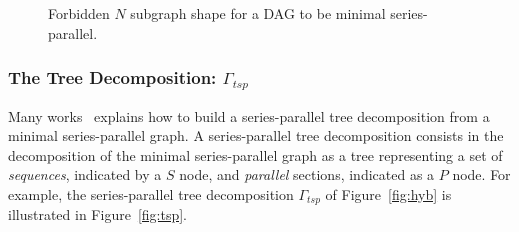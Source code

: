 \begin{figure}[h!]
\begin{center}
  \hspace{25pt}
  \caption{Forbidden $N$ subgraph shape for a DAG to be minimal series-parallel.}
  \label{fig:forbidden}
\end{center}
\end{figure}

\subsubsection*{The Tree Decomposition: $\Gamma_{tsp}$}
Many works~\cite{Valdes:1979:RSP:800135.804393,Schoenmakers95anew} explains how to build a series-parallel tree decomposition from a minimal series-parallel graph. A series-parallel tree decomposition consists in the decomposition of the minimal series-parallel graph as a tree representing a set of \emph{sequences}, indicated by a $S$ node, and \emph{parallel} sections, indicated as a $P$ node. For example, the series-parallel tree decomposition $\Gamma_{tsp}$ of Figure~\ref{fig:hyb} is illustrated in Figure~\ref{fig:tsp}.

